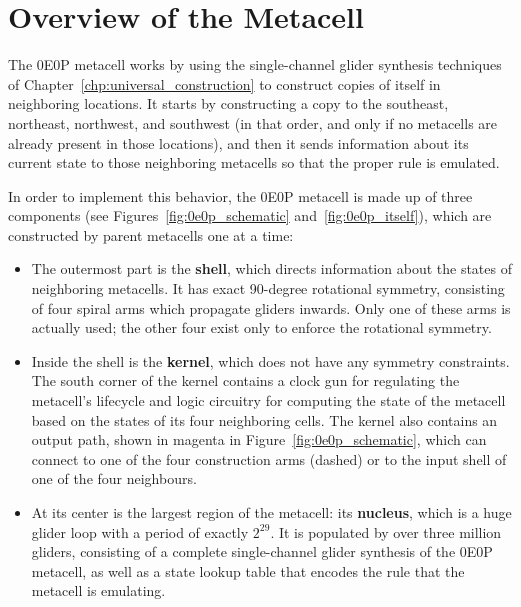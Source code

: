 \section{Overview of the Metacell}\label{sec:0e0p_structure}

The 0E0P metacell works by using the single-channel glider synthesis techniques of Chapter~\ref{chp:universal_construction} to construct copies of itself in neighboring locations. It starts by constructing a copy to the southeast, northeast, northwest, and southwest (in that order, and only if no metacells are already present in those locations), and then it sends information about its current state to those neighboring metacells so that the proper rule is emulated.

In order to implement this behavior, the 0E0P metacell is made up of three components (see Figures~\ref{fig:0e0p_schematic} and~\ref{fig:0e0p_itself}), which are constructed by parent metacells one at a time:\smallskip

\begin{itemize}
	\item The outermost part is the \textbf{shell}, which directs information about the states of neighboring metacells. It has exact 90-degree rotational symmetry, consisting of four spiral arms which propagate gliders inwards. Only one of these arms is actually used; the other four exist only to enforce the rotational symmetry.\smallskip
	
	\item Inside the shell is the \textbf{kernel}, which does not have any symmetry constraints. The south corner of the kernel contains a clock gun for regulating the metacell's lifecycle and logic circuitry for computing the state of the metacell based on the states of its four neighboring cells. The kernel also contains an output path, shown in magenta in Figure~\ref{fig:0e0p_schematic}, which can connect to one of the four construction arms (dashed) or to the input shell of one of the four neighbours.\smallskip
	
	\item At its center is the largest region of the metacell: its \textbf{nucleus}, which is a huge glider loop with a period of exactly $2^{29}$. It is populated by over three million gliders, consisting of a complete single-channel glider synthesis of the 0E0P metacell, as well as a state lookup table that encodes the rule that the metacell is emulating.\smallskip
\end{itemize}

